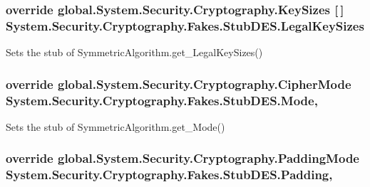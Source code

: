 \hypertarget{class_system_1_1_security_1_1_cryptography_1_1_fakes_1_1_stub_d_e_s_abe494308339d6d34745bc87506ca2872}{
\subsubsection[{Legal\-Key\-Sizes}]{\setlength{\rightskip}{0pt plus 5cm}override global.\-System.\-Security.\-Cryptography.\-Key\-Sizes \mbox{[}$\,$\mbox{]} System.\-Security.\-Cryptography.\-Fakes.\-Stub\-D\-E\-S.\-Legal\-Key\-Sizes\hspace{0.3cm}{\ttfamily [get]}}}\label{class_system_1_1_security_1_1_cryptography_1_1_fakes_1_1_stub_d_e_s_abe494308339d6d34745bc87506ca2872}


Sets the stub of Symmetric\-Algorithm.\-get\-\_\-\-Legal\-Key\-Sizes()

\hypertarget{class_system_1_1_security_1_1_cryptography_1_1_fakes_1_1_stub_d_e_s_aa71de308bb1c8003107eaf07d656883f}{
\subsubsection[{Mode}]{\setlength{\rightskip}{0pt plus 5cm}override global.\-System.\-Security.\-Cryptography.\-Cipher\-Mode System.\-Security.\-Cryptography.\-Fakes.\-Stub\-D\-E\-S.\-Mode\hspace{0.3cm}{\ttfamily [get]}, {\ttfamily [set]}}}\label{class_system_1_1_security_1_1_cryptography_1_1_fakes_1_1_stub_d_e_s_aa71de308bb1c8003107eaf07d656883f}


Sets the stub of Symmetric\-Algorithm.\-get\-\_\-\-Mode()

\hypertarget{class_system_1_1_security_1_1_cryptography_1_1_fakes_1_1_stub_d_e_s_a452fe3e297f54a4efd3bf74e81dc2ee1}{
\subsubsection[{Padding}]{\setlength{\rightskip}{0pt plus 5cm}override global.\-System.\-Security.\-Cryptography.\-Padding\-Mode System.\-Security.\-Cryptography.\-Fakes.\-Stub\-D\-E\-S.\-Padding\hspace{0.3cm}{\ttfamily [get]}, {\ttfamily [set]}}}\label{class_system_1_1_security_1_1_cryptography_1_1_fakes_1_1_stub_d_e_s_a452fe3e297f54a4efd3bf74e81dc2ee1}


